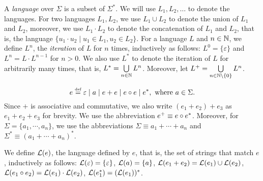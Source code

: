 A \emph{language} over $\Sigma$ is a subset of $\Sigma^*$. We will use $L_1, L_2, \dots$ to denote the languages. For two languages $L_1, L_2$, we use $L_1 \cup L_2$ to denote the union of $L_1$ and $L_2$, moreover, we use $L_1 \cdot L_2$ to denote the concatenation of $L_1$ and $L_2$, that is, the language $\{u_1 \cdot u_2 \mid u_1 \in L_1, u_2 \in L_2\}$. For a language $L$ and $n \in \mathbb{N}$, we define $L^n$, the \emph{iteration} of $L$ for $n$ times, inductively as follows: $L^0=\{\varepsilon\}$ and $L^{n} =L \cdot L^{n-1}$ for $n > 0$. We also use $L^*$ to denote the iteration of $L$ for arbitrarily many times, that is, $L^* = \bigcup \limits_{n \in \mathbb{N}} L^n$. Moreover, let $L^+ = \bigcup \limits_{n \in \mathbb{N} \setminus \{0\}} L^n$.

\begin{definition}
	\[e \eqdef \varepsilon \mid a \mid e + e \mid e \concat e \mid e^*, \mbox{ where } a \in \Sigma. \]
	Since $+$ is associative and commutative, we also write $(e_1 + e_2) + e_3$ as $e_1 + e_2 + e_3$ for brevity. We use the abbreviation $e^+ \equiv e \circ e^*$. Moreover, for $\Sigma = \{a_1, \cdots, a_n\}$, we use the abbreviations $\Sigma \equiv a_1 + \cdots + a_n$ and $\Sigma^\ast \equiv (a_1 + \cdots + a_n)^\ast$. 
\end{definition}
We define $\mathcal{L}(e)$, the language defined by $e$, that is, the set of strings that match $e$, inductively as follows: 
$\mathcal{L}(\varepsilon) =\{\varepsilon\}$,
%
$\mathcal{L}(a)= \{a\}$,
%
$\mathcal{L}(e_1 + e_2) = \mathcal{L}(e_1) \cup \mathcal{L}(e_2)$,
%
$\mathcal{L}(e_1 \circ e_2) = \mathcal{L}(e_1) \cdot \mathcal{L}(e_2)$,
%
$\mathcal{L}(e_1^*)=(\mathcal{L}(e_1))^*$.


